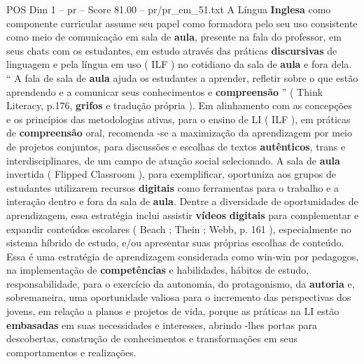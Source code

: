 \begin{textsample}{POS Dim 1 – pr – Score 81.00 – pr/pr\_em\_51.txt}  \label{ex:f1_pos_026}
A Língua \textbf{Inglesa} como componente curricular assume seu papel como formadora pelo seu uso consistente como meio de comunicação em sala de \textbf{aula}, presente na fala do professor, em seus chats com os estudantes, em estudo através das práticas \textbf{discursivas} de linguagem e pela língua em uso ( ILF ) no cotidiano da sala de \textbf{aula} e fora dela. “ A fala de sala de \textbf{aula} ajuda os estudantes a aprender, refletir sobre o que estão aprendendo e a comunicar seus conhecimentos e \textbf{compreensão} ” ( Think Literacy, p.176, \textbf{grifos} e tradução própria ).
Em alinhamento com as concepções e os princípios das metodologias ativas, para o ensino de LI ( ILF ), em práticas de \textbf{compreensão} oral, recomenda -se a maximização da aprendizagem por meio de projetos conjuntos, para discussões e escolhas de textos \textbf{autênticos}, trans e interdisciplinares, de um campo de atuação social selecionado.
A sala de \textbf{aula} invertida ( Flipped Classroom ), para exemplificar, oportuniza aos grupos de estudantes utilizarem recursos \textbf{digitais} como ferramentas para o trabalho e a interação dentro e fora da sala de \textbf{aula}.
Dentre a diversidade de oportunidades de aprendizagem, essa estratégia inclui assistir \textbf{vídeos} \textbf{digitais} para complementar e expandir conteúdos escolares ( Beach ; Thein ; Webb, p. 161 ), especialmente no sistema híbrido de estudo, e/ou apresentar suas próprias escolhas de conteúdo.
Essa é uma estratégia de aprendizagem considerada como win-win por pedagogos, na implementação de \textbf{competências} e habilidades, hábitos de estudo, responsabilidade, para o exercício da autonomia, do protagonismo, da \textbf{autoria} e, sobremaneira, uma oportunidade valiosa para o incremento das perspectivas dos jovens, em relação a planos e projetos de vida, porque as práticas na LI estão \textbf{embasadas} em suas necessidades e interesses, abrindo -lhes portas para descobertas, construção de conhecimentos e transformações em seus comportamentos e realizações.

\end{textsample}
